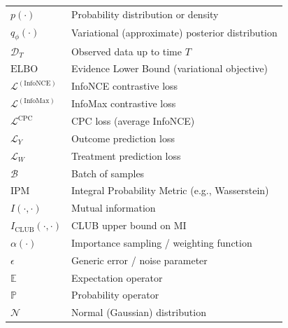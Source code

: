 \documentclass[11pt]{article}
\begin{document}
\begin{table}[htbp]
{\begin{tabular}{ll}
$p(\cdot)$            & Probability distribution or density \\
$q_\phi(\cdot)$       & Variational (approximate) posterior distribution \\
$\mathcal{D}_T$       & Observed data up to time $T$ \\[0.5ex]

$\mathrm{ELBO}$       & Evidence Lower Bound (variational objective) \\
$\mathcal{L}^{(\mathrm{InfoNCE})}$ & InfoNCE contrastive loss \\
$\mathcal{L}^{(\mathrm{InfoMax})}$ & InfoMax contrastive loss \\
$\mathcal{L}^{\mathrm{CPC}}$ & CPC loss (average InfoNCE) \\
$\mathcal{L}_Y$       & Outcome prediction loss \\
$\mathcal{L}_W$       & Treatment prediction loss \\
$\mathcal{B}$         & Batch of samples \\[0.5ex]

$\mathrm{IPM}$        & Integral Probability Metric (e.g., Wasserstein) \\
$I(\cdot,\cdot)$      & Mutual information \\
$I_{\mathrm{CLUB}}(\cdot,\cdot)$ & CLUB upper bound on MI \\
$\alpha(\cdot)$       & Importance sampling / weighting function \\
$\epsilon$            & Generic error / noise parameter \\[0.5ex]

$\mathbb{E}$          & Expectation operator \\
$\mathbb{P}$          & Probability operator \\
$\mathcal{N}$         & Normal (Gaussian) distribution \\[0.5ex]


\end{tabular}}
\end{table}
\end{document}
